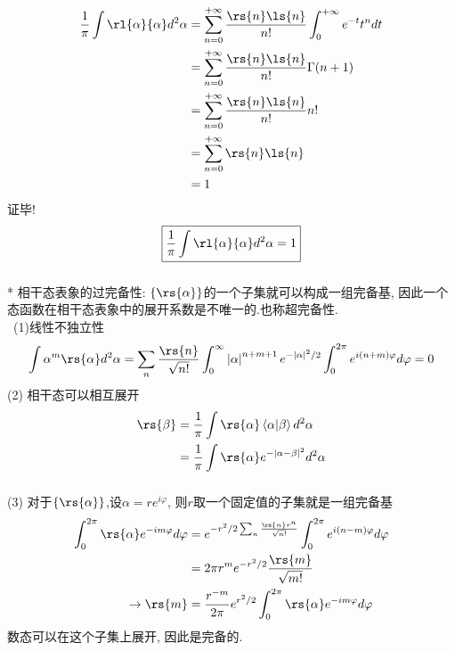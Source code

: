 \begin{frame}
 \frametitle{}
 \[ 
    \begin{aligned}
        \frac{1}{\pi} \int \rl{\alpha}{\alpha}d ^2 \alpha    
        &= \sum_{n=0} ^{+\infty}  \frac{\rs{n}\ls{n }}{n!} 
        \int _0 ^ {+\infty}  e^{-t}  t^n   dt  \\ 
        &= \sum_{n=0} ^{+\infty}  \frac{\rs{n}\ls{n }}{n!} 
        \Gamma(n+1)  \\ 
        &= \sum_{n=0} ^{+\infty}  \frac{\rs{n}\ls{n }}{n!} 
        n!  \\ 
        &= \sum_{n=0} ^{+\infty}  \rs{n}\ls{n } \\
        &= 1
    \end{aligned}    
 \] 
 证毕!
\[  \boxed{ \frac{1}{\pi} \int \rl{\alpha}{\alpha}d ^2 \alpha =1} \]
\end{frame}

\begin{frame} 
\frametitle{}
     * 相干态表象的过完备性: $\{\rs{\alpha}\}$的一个子集就可以构成一组完备基, 因此一个态函数在相干态表象中的展开系数是不唯一的.也称超完备性. \\ {\vspace*{0.3em}}
     \证~(1)线性不独立性
     \[ \begin{aligned}
         \int \alpha ^m \rs{\alpha} d^2 \alpha &= \sum_n \frac{\rs{n}}{\sqrt{n!}} \int_0 ^\infty \left|\alpha\right|^{n+m+1} e ^ {- \left|\alpha\right|^2 /2} \int_0 ^{2\pi} e ^{i(n+m)\varphi}  d \varphi =0\\
     \end{aligned}\] 
     (2) 相干态可以相互展开
     \[ \begin{aligned}
        \rs{ \beta } & = \frac{1}{\pi} \int \rs{\alpha} \left\langle \alpha | \beta \right\rangle  d ^2 \alpha \\ 
        &= \frac{1}{\pi} \int \rs{\alpha} e^{-  \left| \alpha - \beta\right|^2}  d ^2 \alpha
    \end{aligned}\] 
\end{frame}

\begin{frame} 
\frametitle{}
     (3) 对于$\{\rs{\alpha}\}$,设$\alpha = r e ^{i \varphi}$, 则$r$取一个固定值的子集就是一组完备基
      \[ \begin{aligned}
          \int _0 ^{2\pi} \rs{\alpha} e ^{-i m \varphi} d \varphi &= e^{- r^2 /2 \sum_n \frac{\rs{n} r^n}{\sqrt{n!}} } \int _0 ^{2\pi} e ^{i (n-m) \varphi} d \varphi \\
          &= 2\pi r^m e^{- r^2 /2}  \frac{\rs{m}}{\sqrt{m!}} \\
        \to \rs{m} &= \frac{r^{-m}}{2\pi}e^{ r^2 /2}  \int _0 ^{2\pi} \rs{\alpha} e ^{-i m \varphi} d \varphi 
      \end{aligned}\] 
      数态可以在这个子集上展开, 因此是完备的. 
\end{frame}

